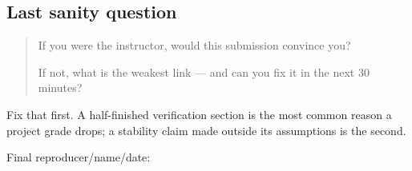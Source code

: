 \documentclass[11pt]{article}
\begin{document}
\subsection*{Last sanity question}
\begin{quote}
If you were the instructor, would this submission convince you?

If not, what is the weakest link --- and can you fix it in the next 30 minutes?
\end{quote}
Fix that first. A half-finished verification section is the most common reason
a project grade drops; a stability claim made outside its assumptions is the
second.

\medskip
Final reproducer/name/date: \hrulefill
\end{document}
